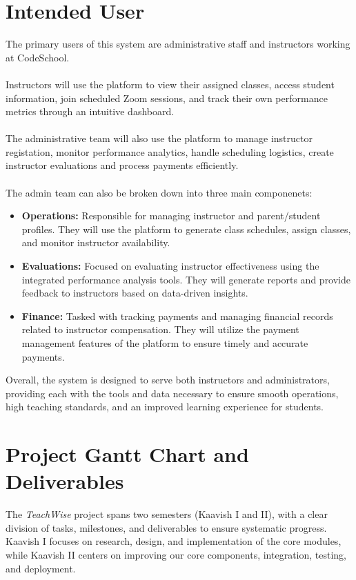 \section{Intended User}

The primary users of this system are administrative staff and instructors working at CodeSchool. 
\\
\\
\indent Instructors will use the platform to view their assigned classes, access student information, join scheduled Zoom sessions, and track their own performance metrics through an intuitive dashboard.
\\
\\
\indent The administrative team will also use the platform to manage instructor registation, monitor performance analytics, handle scheduling logistics, create instructor evaluations and process payments efficiently.
\\
\\
\indent The admin team can also be broken down into three main componenets:
\begin{itemize}
    \item \textbf{Operations:} Responsible for managing instructor and parent/student profiles. They will use the platform to generate class schedules, assign classes, and monitor instructor availability.
    \item \textbf{Evaluations:} Focused on evaluating instructor effectiveness using the integrated performance analysis tools. They will generate reports and provide feedback to instructors based on data-driven insights.
    \item \textbf{Finance:} Tasked with tracking payments and managing financial records related to instructor compensation. They will utilize the payment management features of the platform to ensure timely and accurate payments.
\end{itemize}

Overall, the system is designed to serve both instructors and administrators, providing each with the tools and data necessary to ensure smooth operations, high teaching standards, and an improved learning experience for students.

\section{Project Gantt Chart and Deliverables}

The \textit{TeachWise}  project spans two semesters (Kaavish I and II), with a clear division of tasks, milestones, and deliverables to ensure systematic progress. Kaavish I focuses on research, design, and implementation of the core modules, while Kaavish II centers on improving our core components, integration, testing, and deployment.

